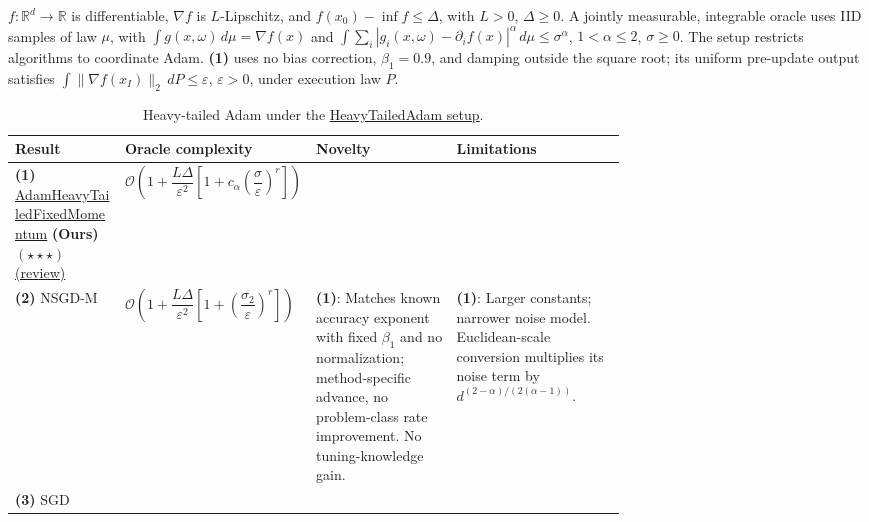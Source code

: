 \begin{table}[tp]
\centering
\caption{Heavy-tailed Adam under the \href{https://github.com/k3nfalt/longtails/blob/main/LongTails/Setups/HeavyTailedAdam.lean}{HeavyTailedAdam setup}.}\label{tab:HeavyTailedAdam}
\parbox{\linewidth}{\footnotesize $f:\mathbb{R}^d\to\mathbb{R}$ is differentiable, $\nabla f$ is $L$-Lipschitz, and $f(x_0)-\inf f\le\Delta$, with $L>0$, $\Delta\ge0$. A jointly measurable, integrable oracle uses IID samples of law $\mu$, with $\int g(x,\omega)\,d\mu=\nabla f(x)$ and $\int\sum_i|g_i(x,\omega)-\partial_i f(x)|^\alpha\,d\mu\le\sigma^\alpha$, $1<\alpha\le2$, $\sigma\ge0$. The setup restricts algorithms to coordinate Adam. \textbf{(1)} uses no bias correction, $\beta_1=0.9$, and damping outside the square root; its uniform pre-update output satisfies $\int\|\nabla f(x_I)\|_2\,dP\le\varepsilon$, $\varepsilon>0$, under execution law $P$.}\par\smallskip
\begin{threeparttable}
\footnotesize
\setlength{\tabcolsep}{4pt}\renewcommand{\arraystretch}{1.25}
\begin{tabularx}{\linewidth}{@{}>{\raggedright\arraybackslash}p{0.18\linewidth}>{\raggedright\arraybackslash}p{0.30\linewidth}>{\raggedright\arraybackslash}p{0.23\linewidth}>{\raggedright\arraybackslash}X@{}}
\toprule
\textbf{Result} & \textbf{Oracle complexity} & \textbf{Novelty} & \textbf{Limitations} \\
\midrule
\textbf{(1)} \href{https://github.com/k3nfalt/longtails/blob/main/LongTails/Theorems/AdamHeavyTailedFixedMomentum.lean}{Adam\allowbreak Heavy\allowbreak Tailed\allowbreak Fixed\allowbreak Momentum} \textbf{(Ours)} $(\star\star\star)$ \href{https://github.com/k3nfalt/longtails/blob/main/scripts/reviews/AdamHeavyTailedFixedMomentum.md}{(review)}
& $\mathcal{O}\!\left(1+\dfrac{L\Delta}{\varepsilon^2}\left[1+c_\alpha\left(\dfrac{\sigma}{\varepsilon}\right)^r\right]\right)$ & & \\
\midrule[1.2pt]
\textbf{(2)} NSGD-M \citep[Cor.~19, arXiv v3]{htaHubler2025}
& $\mathcal{O}\!\left(1+\dfrac{L\Delta}{\varepsilon^2}\left[1+\left(\dfrac{\sigma_2}{\varepsilon}\right)^r\right]\right)$
& \textbf{(1)}: Matches known accuracy exponent with fixed $\beta_1$ and no normalization; method-specific advance, no problem-class rate improvement. No tuning-knowledge gain.
& \textbf{(1)}: Larger constants; narrower noise model. Euclidean-scale conversion multiplies its noise term by $d^{(2-\alpha)/(2(\alpha-1))}$. \\
\midrule
\textbf{(3)} SGD \citep[Thm.~4.1, constant steps]{htaLiu2026}

\end{tabularx}
\end{threeparttable}
\end{table}
